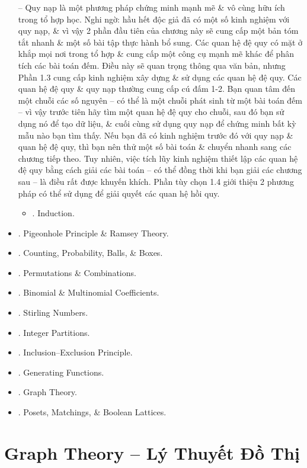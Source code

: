 \documentclass{article}
\begin{document}
\begin{itemize}
	-- Quy nạp là một phương pháp chứng minh mạnh mẽ \& vô cùng hữu ích trong tổ hợp học. Nghi ngờ: hầu hết độc giả đã có một số kinh nghiệm với quy nạp, \& vì vậy 2 phần đầu tiên của chương này sẽ cung cấp một bản tóm tắt nhanh \& một số bài tập thực hành bổ sung. Các quan hệ đệ quy có mặt ở khắp mọi nơi trong tổ hợp \& cung cấp một công cụ mạnh mẽ khác để phân tích các bài toán đếm. Điều này sẽ quan trọng thông qua văn bản, nhưng Phần 1.3 cung cấp kinh nghiệm xây dựng \& sử dụng các quan hệ đệ quy. Các quan hệ đệ quy \& quy nạp thường cung cấp cú đấm 1-2. Bạn quan tâm đến một chuỗi các số nguyên -- có thể là một chuỗi phát sinh từ một bài toán đếm -- vì vậy trước tiên hãy tìm một quan hệ đệ quy cho chuỗi, sau đó bạn sử dụng nó để tạo dữ liệu, \& cuối cùng sử dụng quy nạp để chứng minh bất kỳ mẫu nào bạn tìm thấy. Nếu bạn đã có kinh nghiệm trước đó với quy nạp \& quan hệ đệ quy, thì bạn nên thử một số bài toán \& chuyển nhanh sang các chương tiếp theo. Tuy nhiên, việc tích lũy kinh nghiệm thiết lập các quan hệ đệ quy bằng cách giải các bài toán -- có thể đồng thời khi bạn giải các chương sau -- là điều rất được khuyến khích. Phần tùy chọn 1.4 giới thiệu 2 phương pháp có thể sử dụng để giải quyết các quan hệ hồi quy.
	\begin{itemize}
		\item {. Induction.} 
	\end{itemize}
	\item {. Pigeonhole Principle \& Ramsey Theory.}
	\item {. Counting, Probability, Balls, \& Boxes.}
	\item {. Permutations \& Combinations.}
	\item {. Binomial \& Multinomial Coefficients.}
	\item {. Stirling Numbers.}
	\item {. Integer Partitions.}
	\item {. Inclusion--Exclusion Principle.}
	\item {. Generating Functions.}
	\item {. Graph Theory.}
	\item {. Posets, Matchings, \& Boolean Lattices.}
\end{itemize}


\section{Graph Theory -- Lý Thuyết Đồ Thị}
\end{document}

